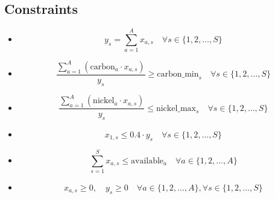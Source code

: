 \documentclass{article}
\begin{document}
\subsection*{Constraints}
\begin{itemize}
    \item {}
    \[
    y_s = \sum_{a=1}^{A} x_{a,s} \quad \forall s \in \{1, 2, \ldots, S\}
    \]
    \item {}
    \[
    \frac{\sum_{a=1}^{A} \left(\text{carbon}_{a} \cdot x_{a,s}\right)}{y_s} \geq \text{carbon\_min}_{s} \quad \forall s \in \{1, 2, \ldots, S\}
    \]
    \item {}
    \[
    \frac{\sum_{a=1}^{A} \left(\text{nickel}_{a} \cdot x_{a,s}\right)}{y_s} \leq \text{nickel\_max}_{s} \quad \forall s \in \{1, 2, \ldots, S\}
    \]
    \item {}
    \[
    x_{1,s} \leq 0.4 \cdot y_s \quad \forall s \in \{1, 2, \ldots, S\}
    \]
    \item {}
    \[
    \sum_{s=1}^{S} x_{a,s} \leq \text{available}_{a} \quad \forall a \in \{1, 2, \ldots, A\}
    \]
    \item {}
    \[
    x_{a,s} \geq 0, \quad y_s \geq 0 \quad \forall a \in \{1, 2, \ldots, A\}, \forall s \in \{1, 2, \ldots, S\}
    \]
\end{itemize}
\end{document}
